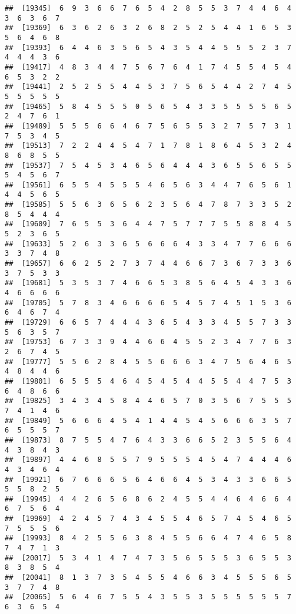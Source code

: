 \documentclass[
]{book}
\begin{document}
\begin{verbatim}
##  [19345]  6  9  3  6  6  7  6  5  4  2  8  5  5  3  7  4  4  6  4  3  6  3  6  7
##  [19369]  6  3  6  2  6  3  2  6  8  2  5  2  5  4  4  1  6  5  3  5  6  4  6  8
##  [19393]  6  4  4  6  3  5  6  5  4  3  5  4  4  5  5  5  2  3  7  4  4  4  3  6
##  [19417]  4  8  3  4  4  7  5  6  7  6  4  1  7  4  5  5  4  5  4  6  5  3  2  2
##  [19441]  2  5  2  5  5  4  4  5  3  7  5  6  5  4  4  2  7  4  5  5  5  5  5  5
##  [19465]  5  8  4  5  5  5  0  5  6  5  4  3  3  5  5  5  5  6  5  2  4  7  6  1
##  [19489]  5  5  5  6  6  4  6  7  5  6  5  5  3  2  7  5  7  3  1  7  5  3  4  5
##  [19513]  7  2  2  4  4  5  4  7  1  7  8  1  8  6  4  5  3  2  4  8  6  8  5  5
##  [19537]  7  5  4  5  3  4  6  5  6  4  4  4  3  6  5  5  6  5  5  5  4  5  6  7
##  [19561]  6  5  5  4  5  5  5  4  6  5  6  3  4  4  7  6  5  6  1  4  4  5  6  5
##  [19585]  5  5  6  3  6  5  6  2  3  5  6  4  7  8  7  3  3  5  2  8  5  4  4  4
##  [19609]  7  6  5  5  3  6  4  4  7  5  7  7  7  5  5  8  8  4  5  5  2  3  6  5
##  [19633]  5  2  6  3  3  6  5  6  6  6  4  3  3  4  7  7  6  6  6  3  3  7  4  8
##  [19657]  6  6  2  5  2  7  3  7  4  4  6  6  7  3  6  7  3  3  6  3  7  5  3  3
##  [19681]  5  3  5  3  7  4  6  6  5  3  8  5  6  4  5  4  3  3  6  4  6  6  6  6
##  [19705]  5  7  8  3  4  6  6  6  6  5  4  5  7  4  5  1  5  3  6  6  4  6  7  4
##  [19729]  6  6  5  7  4  4  4  3  6  5  4  3  3  4  5  5  7  3  3  5  6  3  5  7
##  [19753]  6  7  3  3  9  4  4  6  6  4  5  5  2  3  4  7  7  6  3  2  6  7  4  5
##  [19777]  5  5  6  2  8  4  5  5  6  6  6  3  4  7  5  6  4  6  5  4  8  4  4  6
##  [19801]  6  5  5  5  4  6  4  5  4  5  4  4  5  5  4  4  7  5  3  6  4  8  6  6
##  [19825]  3  4  3  4  5  8  4  4  6  5  7  0  3  5  6  7  5  5  5  7  4  1  4  6
##  [19849]  5  6  6  6  4  5  4  1  4  4  5  4  5  6  6  6  3  5  7  6  5  5  5  7
##  [19873]  8  7  5  5  4  7  6  4  3  3  6  6  5  2  3  5  5  6  4  4  3  8  4  3
##  [19897]  4  4  6  8  5  5  7  9  5  5  5  4  5  4  7  4  4  4  6  4  3  4  6  4
##  [19921]  6  7  6  6  6  5  6  4  6  6  4  5  3  4  3  3  6  6  5  5  5  8  2  5
##  [19945]  4  4  2  6  5  6  8  6  2  4  5  5  4  4  6  4  6  6  4  6  7  5  6  4
##  [19969]  4  2  4  5  7  4  3  4  5  5  4  6  5  7  4  5  4  6  5  7  5  5  5  6
##  [19993]  8  4  2  5  5  6  3  8  4  5  5  6  6  4  7  4  6  5  8  7  4  7  1  3
##  [20017]  5  3  4  1  4  7  4  7  3  5  6  5  5  5  3  6  5  5  3  8  3  8  5  4
##  [20041]  8  1  3  7  3  5  4  5  5  4  6  6  3  4  5  5  5  6  5  3  7  7  4  8
##  [20065]  5  6  4  6  7  5  5  4  3  5  5  3  5  5  5  5  5  5  7  6  3  6  5  4

\end{verbatim}
\end{document}
